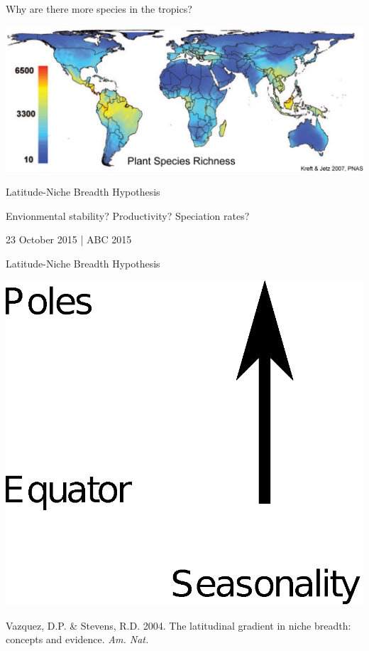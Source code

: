 \documentclass{beamer}
\begin{document}
  \begin{frame}{Why are there more species in the tropics?}

    \begin{center}
      \includegraphics*[width=.8\textwidth]{Figures/plant_richness.eps}


      \vspace{.5cm}

      {\Large Latitude-Niche Breadth Hypothesis}

      \vspace{.5cm}

      {\color{purple}Envionmental stability? Productivity?}
      Speciation rates?

      \vspace{1cm}

      {\color{white}23 October 2015 | ABC 2015}

    \end{center}
  \end{frame}


  \begin{frame}{Latitude-Niche Breadth Hypothesis}

    \begin{center}
      \includegraphics[width=.8\textwidth]{Figures/latitude_niche_breadth_1.eps}
    \end{center}

    \vspace{1.5cm}

    \tiny{Vazquez, D.P. \& Stevens, R.D. 2004. The latitudinal gradient in niche breadth: concepts and evidence. \emph{Am. Nat.}}
  \end{frame}
\end{document}
